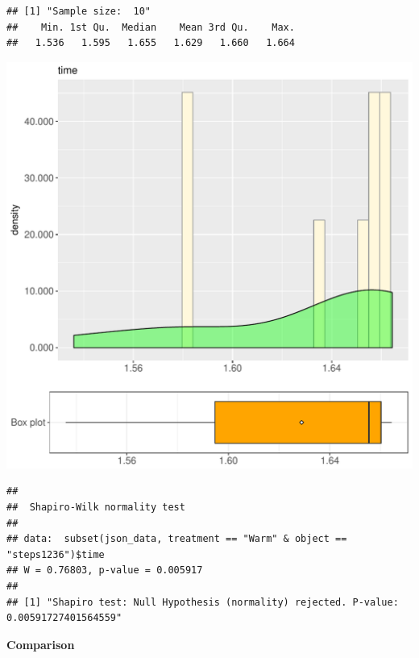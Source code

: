 \documentclass{article}\usepackage[]{graphicx}\usepackage[]{color}
\makeatletter
\def\maxwidth{ %
  \ifdim\Gin@nat@width>\linewidth
    \linewidth
  \else
    \Gin@nat@width
  \fi
}
\newenvironment{kframe}{%
 \def\at@end@of@kframe{}%
 \ifinner\ifhmode%
  \def\at@end@of@kframe{\end{minipage}}%
  \begin{minipage}{\columnwidth}%
 \fi\fi%
 \def\FrameCommand##1{\hskip\@totalleftmargin \hskip-\fboxsep
 \colorbox{shadecolor}{##1}\hskip-\fboxsep
     \hskip-\linewidth \hskip-\@totalleftmargin \hskip\columnwidth}%
 \MakeFramed {\advance\hsize-\width
   \@totalleftmargin\z@ \linewidth\hsize
   \@setminipage}}%
 {\par\unskip\endMakeFramed%
 \at@end@of@kframe}
\newenvironment{knitrout}{}{} %
\makeatother
\begin{document}
\begin{knitrout}
\color{fgcolor}\begin{kframe}
\begin{verbatim}
## [1] "Sample size:  10"
##    Min. 1st Qu.  Median    Mean 3rd Qu.    Max. 
##   1.536   1.595   1.655   1.629   1.660   1.664
\end{verbatim}
\end{kframe}
\includegraphics[width=\maxwidth]{figure/RH1_Warm_steps1236-1} 
\begin{kframe}\begin{verbatim}
## 
## 	Shapiro-Wilk normality test
## 
## data:  subset(json_data, treatment == "Warm" & object == "steps1236")$time
## W = 0.76803, p-value = 0.005917
## 
## [1] "Shapiro test: Null Hypothesis (normality) rejected. P-value: 0.00591727401564559"
\end{verbatim}
\end{kframe}
\end{knitrout}
  
 \textbf{Comparison}
  
\end{document}
